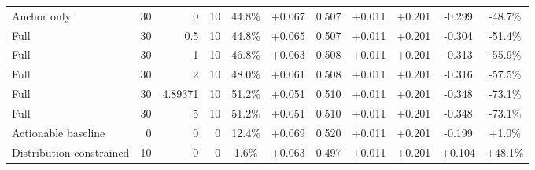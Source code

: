 \begin{table}[htbp]
\begin{tabular}{lrrrccccccc}
Anchor only & 30 & 0 & 10 & 44.8\% & +0.067 & 0.507 & +0.011 & +0.201 & -0.299 & -48.7\% \\
Full & 30 & 0.5 & 10 & 44.8\% & +0.065 & 0.507 & +0.011 & +0.201 & -0.304 & -51.4\% \\
Full & 30 & 1 & 10 & 46.8\% & +0.063 & 0.508 & +0.011 & +0.201 & -0.313 & -55.9\% \\
Full & 30 & 2 & 10 & 48.0\% & +0.061 & 0.508 & +0.011 & +0.201 & -0.316 & -57.5\% \\
Full & 30 & 4.89371 & 10 & 51.2\% & +0.051 & 0.510 & +0.011 & +0.201 & -0.348 & -73.1\% \\
Full & 30 & 5 & 10 & 51.2\% & +0.051 & 0.510 & +0.011 & +0.201 & -0.348 & -73.1\% \\
Actionable baseline & 0 & 0 & 0 & 12.4\% & +0.069 & 0.520 & +0.011 & +0.201 & -0.199 & +1.0\% \\
Distribution constrained & 10 & 0 & 0 & 1.6\% & +0.063 & 0.497 & +0.011 & +0.201 & +0.104 & +48.1\% \\
\bottomrule
\end{tabular}
\end{table}